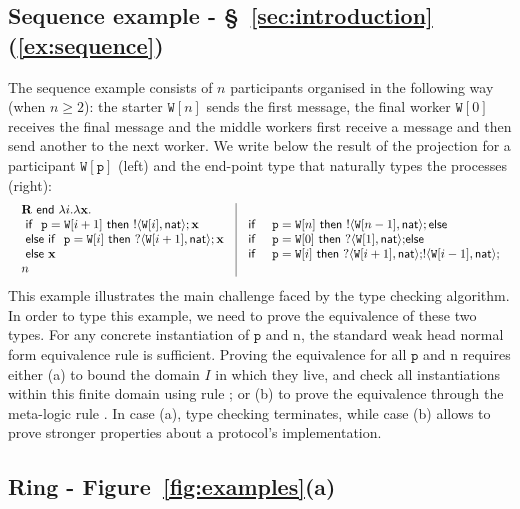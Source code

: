 \documentclass{LMCS}
\newcommand{\ptilde}[1]{{\ensuremath{#1}}}
\newcommand{\kf}[1]{\textup{\textsf{#1}}\xspace}
\newcommand{\pp}{\ensuremath{\at{\p}}}
\newcommand{\participant}[1]{\ensuremath{\mathtt{#1}}}
\newcommand{\p}{\ensuremath{\participant{p}}}
\newcommand{\at}[1]{\ensuremath{\ptilde{#1}}}
\newcommand{\RECSEQ}[4]{\ensuremath{\mathbf{R} \ #1\ \lambda #2.\lambda #3.#4}}
\newcommand{\End}{\kf{end}}
\newcommand{\Nat}{\kf{nat}}
\newcommand{\trule}[1]{\text{\footnotesize{\ensuremath{\lfloor\text{\sc{#1}}\rfloor}}}}
\newcommand{\Lout}[3]{\ensuremath{!\langle #1,#2\rangle;#3}}
\newcommand{\Lin}[3]{\ensuremath{?\langle #1,#2\rangle;#3}}
\newcommand{\IF}{\kf{if}}
\newcommand{\THEN}{\kf{then}}
\newcommand{\ELSE}{\kf{else}}
\newcommand{\ii}{\ensuremath{i}}
\newcommand{\n}{\ensuremath{\mathrm{n}}}
\newcommand{\xx}{\ensuremath{\mathbf{x}}}
\newcommand{\II}{\ensuremath{I}}
\newcommand{\W}{\ensuremath{\mathtt{W}}}
\begin{document}
\subsection{Sequence example - \S~\ref{sec:introduction}
  (\ref{ex:sequence})}
The sequence example consists of $n$ participants organised in the following way
(when $n\geq 2$): the starter $\W[n]$ sends the first message, the final worker
$\W[0]$ receives the final message and the middle workers first receive a
message and then send another to the next worker. We write below the result of
the projection for a participant $\W[\pp]$ (left) and the end-point type that
naturally types the processes (right):
{\small
\[
\begin{array}{l|l}
\begin{array}{llll}
   \RECSEQ{\End }{i}{\xx}{\\
\ \IF\ \ \pp=\W[i+1]\ \THEN \ \Lout{\W[i]}{\Nat}\xx \\
\ \ELSE\ \IF\ \ \pp=\W[i]\ \THEN \ \Lin{\W[i+1]}{\Nat}\xx \\
\ \ELSE\ \xx \ } \\
 n
\end{array}
&
\begin{array}{lll}
\IF \ &
\p=\W[n]  \ \THEN \ \Lout{\W[n-1]}{\Nat}{}\ELSE\\
\IF &
\p=\W[0] \ \THEN \ {\Lin{\W[1]}{\Nat}{}}\ELSE\\
\IF & \p=\W[\ii]\  \THEN \  {\Lin{\W[i+1]}{\Nat}{}}{\Lout{\W[i-1]}{\Nat}{\!}}
\end{array}
\end{array}
\]
} 
\noindent
This example illustrates the main challenge faced by the type checking algorithm.
In order to type this example, we need to prove the equivalence
of these two types. For any concrete instantiation of $\p$ and $\n$, the standard weak
head normal form equivalence rule \trule{WfBase} is sufficient.  Proving the
equivalence for all $\p$ and $\n$ requires either (a) to bound the domain $\II$
in which they live, and check all instantiations within this finite domain using
rule \trule{WfRecF}; or (b) to prove the equivalence through the meta-logic
rule \trule{WfRecExt}.  In case (a), type checking terminates, while case (b)
allows to prove stronger properties about a protocol's implementation. 







\subsection{Ring - Figure~\ref{fig:examples}(a)}
\end{document}
